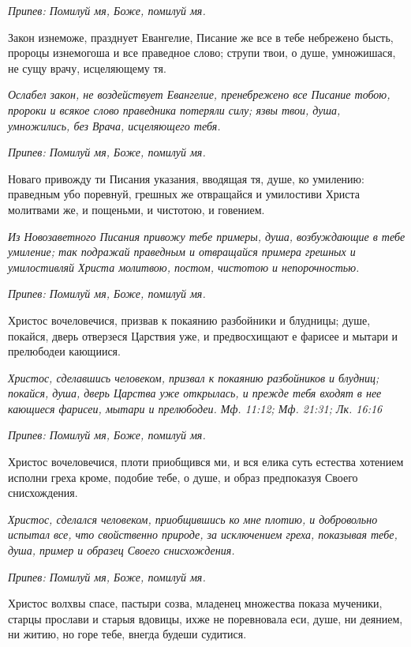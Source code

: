 \itshape Припев:\normalfont{} Помилуй мя, Боже, помилуй мя.


Закон изнеможе, празднует Евангелие, Писание же все в тебе небрежено бысть, пророцы изнемогоша и все праведное слово; струпи твои, о душе, умножишася, не сущу врачу, исцеляющему тя.


\itshape Ослабел закон, не воздействует Евангелие, пренебрежено все Писание тобою, пророки и всякое слово праведника потеряли силу; язвы твои, душа, умножились, без Врача, исцеляющего тебя.\normalfont{}


\itshape Припев:\normalfont{} Помилуй мя, Боже, помилуй мя.


Новаго привожду ти Писания указания, вводящая тя, душе, ко умилению: праведным убо поревнуй, грешных же отвращайся и умилостиви Христа молитвами же, и пощеньми, и чистотою, и говением.


\itshape Из Новозаветного Писания привожу тебе примеры, душа, возбуждающие в тебе умиление; так подражай праведным и отвращайся примера грешных и умилостивляй Христа молитвою, постом, чистотою и непорочностью.\normalfont{}


\itshape Припев:\normalfont{} Помилуй мя, Боже, помилуй мя.


Христос вочеловечися, призвав к покаянию разбойники и блудницы; душе, покайся, дверь отверзеся Царствия уже, и предвосхищают е фарисее и мытари и прелюбодеи кающиися.


\itshape Христос, сделавшись человеком, призвал к покаянию разбойников и блудниц; покайся, душа, дверь Царства уже открылась, и прежде тебя входят в нее кающиеся фарисеи, мытари и прелюбодеи. Мф. 11:12; Мф. 21:31; Лк. 16:16\normalfont{}


\itshape Припев:\normalfont{} Помилуй мя, Боже, помилуй мя.


Христос вочеловечися, плоти приобщився ми, и вся елика суть естества хотением исполни греха кроме, подобие тебе, о душе, и образ предпоказуя Своего снисхождения.


\itshape Христос, сделался человеком, приобщившись ко мне плотию, и добровольно испытал все, что свойственно природе, за исключением греха, показывая тебе, душа, пример и образец Своего снисхождения.\normalfont{}


\itshape Припев:\normalfont{} Помилуй мя, Боже, помилуй мя.


Христос волхвы спасе, пастыри созва, младенец множества показа мученики, старцы прослави и старыя вдовицы, ихже не поревновала еси, душе, ни деянием, ни житию, но горе тебе, внегда будеши судитися.


